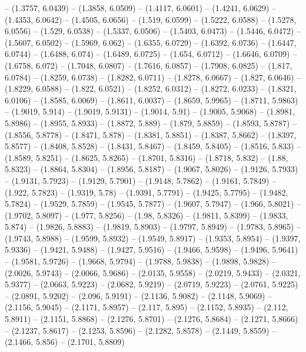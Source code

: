 {   -- (1.3757, 6.0439) -- (1.3858, 6.0509) -- (1.4117, 6.0601) -- (1.4241, 
  6.0629) -- (1.4353, 6.0642) -- (1.4505, 6.0656) -- (1.519, 6.0599) -- (1.5222,
   6.0588) -- (1.5278, 6.0556) -- (1.529, 6.0538) -- (1.5337, 6.0506) -- 
  (1.5403, 6.0473) -- (1.5446, 6.0472) -- (1.5607, 6.0502) -- (1.5969, 6.062) --
   (1.6355, 6.0729) -- (1.6392, 6.0736) -- (1.6447, 6.0744) -- (1.6488, 6.074) 
  -- (1.6489, 6.0725) -- (1.654, 6.0712) -- (1.6646, 6.0709) -- (1.6758, 6.072) 
  -- (1.7048, 6.0807) -- (1.7616, 6.0857) -- (1.7908, 6.0825) -- (1.817, 6.0784)
   -- (1.8259, 6.0738) -- (1.8282, 6.0711) -- (1.8278, 6.0667) -- (1.827, 
  6.0646) -- (1.8229, 6.0588) -- (1.822, 6.0521) -- (1.8252, 6.0312) -- (1.8272,
   6.0233) -- (1.8321, 6.0106) -- (1.8585, 6.0069) -- (1.8611, 6.0037) -- 
  (1.8659, 5.9965) -- (1.8711, 5.9863) -- (1.9019, 5.914) -- (1.9019, 5.9131) --
   (1.9014, 5.91) -- (1.9005, 5.9068) -- (1.8981, 5.8986) -- (1.8955, 5.8933) --
   (1.8872, 5.889) -- (1.879, 5.8859) -- (1.8593, 5.8787) -- (1.8556, 5.8778) --
   (1.8471, 5.878) -- (1.8381, 5.8851) -- (1.8387, 5.8662) -- (1.8397, 5.8577) 
  -- (1.8408, 5.8528) -- (1.8431, 5.8467) -- (1.8459, 5.8405) -- (1.8516, 5.833)
   -- (1.8589, 5.8251) -- (1.8625, 5.8265) -- (1.8701, 5.8316) -- (1.8718, 
  5.832) -- (1.88, 5.8323) -- (1.8864, 5.8304) -- (1.8956, 5.8187) -- (1.9067, 
  5.8026) -- (1.9126, 5.7933) -- (1.9131, 5.7923) -- (1.9129, 5.7901) -- 
  (1.9148, 5.7862) -- (1.9161, 5.7849) -- (1.922, 5.7823) -- (1.9319, 5.78) -- 
  (1.9391, 5.7791) -- (1.9425, 5.7795) -- (1.9482, 5.7824) -- (1.9529, 5.7859) 
  -- (1.9545, 5.7877) -- (1.9607, 5.7947) -- (1.966, 5.8021) -- (1.9702, 5.8097)
   -- (1.977, 5.8256) -- (1.98, 5.8326) -- (1.9811, 5.8399) -- (1.9833, 5.874) 
  -- (1.9826, 5.8883) -- (1.9819, 5.8903) -- (1.9797, 5.8949) -- (1.9783, 
  5.8965) -- (1.9743, 5.8988) -- (1.9599, 5.8932) -- (1.9549, 5.8917) -- 
  (1.9353, 5.8954) -- (1.9397, 5.9336) -- (1.9421, 5.9488) -- (1.9427, 5.9516) 
  -- (1.9466, 5.9598) -- (1.9496, 5.9641) -- (1.9581, 5.9726) -- (1.9668, 
  5.9794) -- (1.9788, 5.9838) -- (1.9898, 5.9828) -- (2.0026, 5.9743) -- 
  (2.0066, 5.9686) -- (2.0135, 5.9558) -- (2.0219, 5.9433) -- (2.0321, 5.9377) 
  -- (2.0663, 5.9223) -- (2.0682, 5.9219) -- (2.0719, 5.9223) -- (2.0761, 
  5.9225) -- (2.0891, 5.9202) -- (2.096, 5.9191) -- (2.1136, 5.9082) -- (2.1148,
   5.9069) -- (2.1156, 5.9045) -- (2.1171, 5.8957) -- (2.117, 5.895) -- (2.1152,
   5.8935) -- (2.112, 5.8911) -- (2.1151, 5.8868) -- (2.1276, 5.8701) -- 
  (2.1276, 5.8684) -- (2.1271, 5.8666) -- (2.1237, 5.8617) -- (2.1253, 5.8596) 
  -- (2.1282, 5.8578) -- (2.1449, 5.8559) -- (2.1466, 5.856) -- (2.1701, 5.8809)
}

